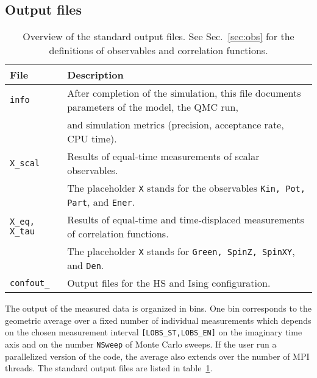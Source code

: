 \subsection{Output files} \label{sec:output}
%
\begin{table}[h]
   \begin{tabular}{l l}
   File & Description \\\hline
   \texttt{info} & After completion of the simulation, this file documents parameters of the  model, the QMC run, \\
   & and simulation metrics (precision, acceptance rate, CPU time).\\
   \texttt{X\_scal} & Results of equal-time measurements of scalar observables. \\
   & The placeholder \texttt{X} stands for the observables \texttt{Kin, Pot, Part}, and \texttt{Ener}. \\
   \texttt{X\_eq, X\_tau} & Results of equal-time and time-displaced measurements of correlation functions. \\
   & The placeholder \texttt{X} stands for \texttt{Green, SpinZ, SpinXY}, and \texttt{Den}. \\   
   \texttt{confout\_<thread number>} & Output files for the HS and Ising configuration. 
   \end{tabular}
   \caption{Overview of the standard output files. 
  See Sec.~\ref{sec:obs} for the definitions of observables and correlation functions. \label{table:output}}
\end{table}
%
The output of the measured data is organized in bins. One bin corresponds to the geometric average over a fixed number of individual measurements which depends 
on the chosen measurement interval \texttt{[LOBS\_ST,LOBS\_EN]} on the imaginary time axis and on the number \texttt{NSweep} of Monte Carlo sweeps. If the user run a parallelized version of the code, the average also extends 
over the number of MPI threads. 
The standard output files are listed in table~\ref{table:output}. 

